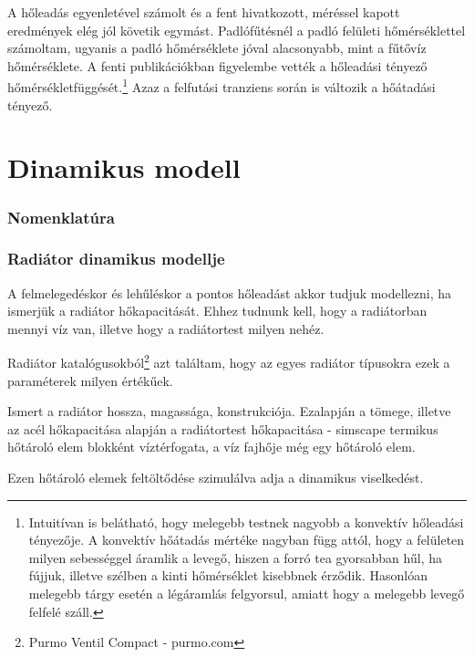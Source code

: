 A hőleadás egyenletével számolt és a fent hivatkozott, méréssel kapott eredmények elég jól követik egymást. Padlófűtésnél a padló felületi hőmérséklettel számoltam, ugyanis a padló hőmérséklete jóval alacsonyabb, mint a fűtővíz hőmérséklete.
A fenti publikációkban figyelembe vették a hőleadási tényező hőmérsékletfüggését.\footnote{Intuitívan is belátható, hogy melegebb testnek nagyobb a konvektív hőleadási tényezője. A konvektív hőátadás mértéke nagyban függ attól, hogy a felületen milyen sebességgel áramlik a levegő, hiszen a forró tea gyorsabban hűl, ha fújjuk, illetve szélben a kinti hőmérséklet kisebbnek érződik. Hasonlóan melegebb tárgy esetén a légáramlás felgyorsul, amiatt hogy a melegebb levegő felfelé száll.} %
Azaz a felfutási tranziens során is változik a hőátadási tényező.



\section{Dinamikus modell}

\subsubsection*{Nomenklatúra}

\subsubsection{Radiátor dinamikus modellje}

A felmelegedéskor és lehűléskor a pontos hőleadást akkor tudjuk modellezni, ha ismerjük a radiátor hőkapacitását. Ehhez tudnunk kell, hogy a radiátorban mennyi víz van, illetve hogy a radiátortest milyen nehéz.

Radiátor katalógusokból\footnote{Purmo Ventil Compact - purmo.com} azt találtam, hogy az egyes radiátor típusokra ezek a paraméterek milyen értékűek.



Ismert a radiátor hossza, magassága, konstrukciója. Ezalapján a
tömege, illetve az acél hőkapacitása alapján a radiátortest hőkapacitása - simscape termikus hőtároló elem blokként
víztérfogata, a víz fajhője még egy hőtároló elem.

Ezen hőtároló elemek feltöltődése szimulálva adja a dinamikus viselkedést.



